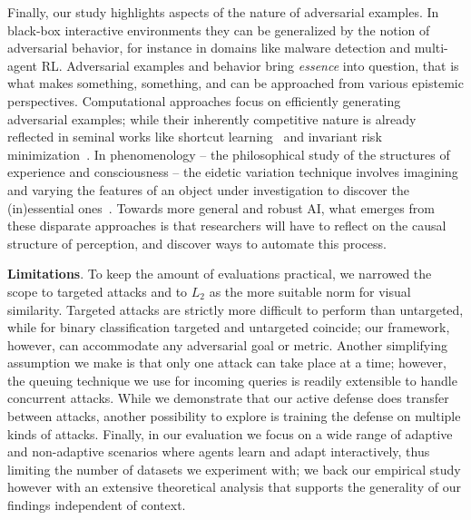 Finally, our study highlights aspects of the nature of adversarial examples.
In black-box interactive environments they can be generalized by the notion of adversarial behavior, for instance in domains like malware detection and multi-agent \gls{RL}.
Adversarial examples and behavior bring \textit{essence} into question, that is what makes something, something, and can be approached from various epistemic perspectives. Computational approaches focus on efficiently generating adversarial examples; while their inherently competitive nature is already reflected in seminal works like shortcut learning~\cite{geirhos2020shortcut} and invariant risk minimization~\cite{ahuja2020invariant}.
In phenomenology -- the philosophical study of the structures of experience and consciousness -- the eidetic variation technique involves imagining and varying the features of an object under investigation to discover the (in)essential ones~\cite{levin1968induction}.
Towards more general and robust AI, what emerges from these disparate approaches is that researchers will have to reflect on the causal structure of perception, and discover ways to automate this process.

\textbf{Limitations}.
To keep the amount of evaluations practical, we narrowed the scope to targeted attacks and to $L_2$ as the more suitable norm for visual similarity.
Targeted attacks are strictly more difficult to perform than untargeted, while for binary classification targeted and untargeted coincide; our framework, however, can accommodate any adversarial goal or metric.
Another simplifying assumption we make is that only one attack can take place at a time; however, the queuing technique we use for incoming queries is readily extensible to handle concurrent attacks.
While we demonstrate that our active defense does transfer between attacks, another possibility to explore is training the defense on multiple kinds of attacks.
Finally, in our evaluation we focus on a wide range of adaptive and non-adaptive scenarios where agents learn and adapt interactively, thus limiting the number of datasets we experiment with; we back our empirical study however with an extensive theoretical analysis that supports the generality of our findings independent of context.

